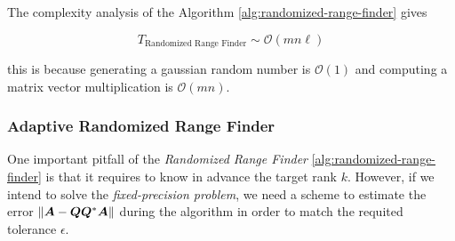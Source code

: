 \begin{figure}[ht]
\begin{center}
\end{center}
\end{figure}

The complexity analysis of the Algorithm \ref{alg:randomized-range-finder}
gives

\begin{equation}\label{eq:analysis-rand-finder}
T_{\text{Randomized Range Finder}}\sim \mathcal{O}(mn\ell)
\end{equation}

this is because generating a gaussian random number is $\mathcal{O}(1)$
and computing a matrix vector multiplication is $\mathcal{O}(mn)$.


\subsubsection{Adaptive Randomized Range Finder}
\label{alg:adaptive-randomized-range-finder}

One important pitfall of the \textit{Randomized Range Finder}
\ref{alg:randomized-range-finder} is that it
requires to know in advance the target rank $k$. However, if we intend
to solve the \textit{fixed-precision problem}, we need a scheme to estimate
the error $\|\bm{A}-\bm{Q}\bm{Q}^*\bm{A}\|$ during the algorithm
in order to match the requited tolerance $\epsilon$.

